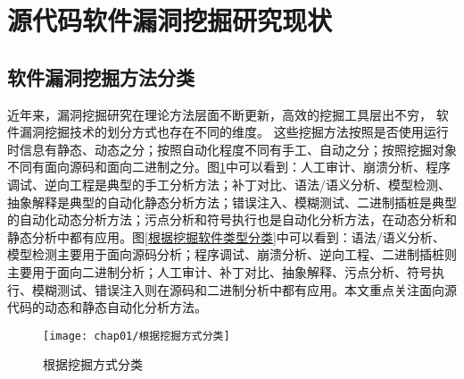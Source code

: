 

\section{源代码软件漏洞挖掘研究现状}

\subsection{软件漏洞挖掘方法分类}
近年来，漏洞挖掘研究在理论方法层面不断更新，高效的挖掘工具层出不穷，
软件漏洞挖掘技术的划分方式也存在不同的维度。 %
这些挖掘方法按照是否使用运行时信息有静态、动态之分；按照自动化程度不同有手工、自动之分；按照挖掘对象不同有面向源码和面向二进制之分。图\ref{根据挖掘方式分类}中可以看到：人工审计、崩溃分析、程序调试、逆向工程是典型的手工分析方法；补丁对比、语法/语义分析、模型检测、抽象解释是典型的自动化静态分析方法；错误注入、模糊测试、二进制插桩是典型的自动化动态分析方法；污点分析和符号执行也是自动化分析方法，在动态分析和静态分析中都有应用。图\ref{根据挖掘软件类型分类}中可以看到：语法/语义分析、模型检测主要用于面向源码分析；程序调试、崩溃分析、逆向工程、二进制插桩则主要用于面向二进制分析；人工审计、补丁对比、抽象解释、污点分析、符号执行、模糊测试、错误注入则在源码和二进制分析中都有应用。本文重点关注面向源代码的动态和静态自动化分析方法。

\begin{figure}[htb]
\begin{center}
\texttt{[image: chap01/根据挖掘方式分类]}
\end{center}
\caption{根据挖掘方式分类}
\label{根据挖掘方式分类}
\end{figure}


